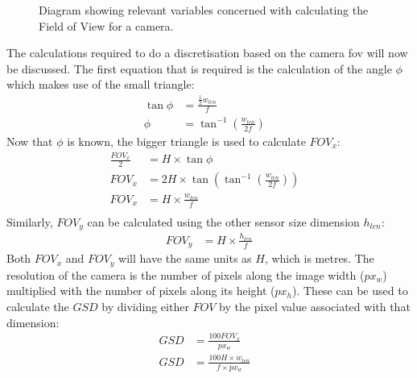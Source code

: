 \begin{figure}[h!]
\begin{tikzpicture}[x=0.75pt,y=0.75pt,yscale=-1,xscale=1]
		
	\end{tikzpicture}
	\caption{Diagram showing relevant variables concerned with calculating the Field of View for a camera.}
	\label{fig:FOV}
\end{figure}
The calculations required to do a discretisation based on the camera \acl{fov} will now be discussed. The first equation that is required is the calculation of the angle $\phi$ which makes use of the small triangle:
\begin{equation}
	\label{eqn:phi}
	\begin{aligned}
		\tan{\phi} &= \frac{\frac{1}{2}w_{len}}{f} &\\
		\phi &= \tan^{-1}{(\frac{w_{len}}{2f})}
	\end{aligned}	
\end{equation}
Now that $\phi$ is known, the bigger triangle is used to calculate $FOV_x$:
\begin{equation}
	\label{eqn:fov_x}
	\begin{aligned}
		\frac{FOV_x}{2} &= H \times \tan{\phi} &\\
		FOV_x &= 2H \times \tan{ (\tan^{-1}{ (\frac{w_{len}}{2f}) }) } &\\
		FOV_x &= H \times \frac{w_{len}}{f} &\\
	\end{aligned}
\end{equation}
Similarly, $FOV_y$ can be calculated using the other sensor size dimension $h_{len}$:
\begin{equation}
	\label{eqn:fov_y}
	\begin{aligned}
		FOV_y &= H \times \frac{h_{len}}{f}
	\end{aligned}
\end{equation}
Both $FOV_x$ and $FOV_y$ will have the same units as $H$, which is metres. The resolution of the camera is the number of pixels along the image width ($px_w$) multiplied with the number of pixels along its height ($px_h$). These can be used to calculate the $GSD$ by dividing either $FOV$ by the pixel value associated with that dimension:
\begin{equation}
	\label{eqn:GSD}
	\begin{aligned}
		GSD &= \frac{100FOV_x}{px_w} &\\
		GSD &= \frac{100H \times w_{len}}{f \times px_w}
	\end{aligned}
\end{equation}

